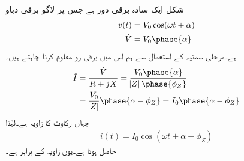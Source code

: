 شکل    ایک سادہ   برقی دور ہے جس پر لاگو برقی دباو
\begin{gather}
\begin{aligned}
v(t)&=V_0 \cos (\omega t +\alpha)\\
\hat{V}&=V_0 \phase{\alpha}
\end{aligned}
\end{gather}
ہے۔مرحلی سمتیہ کے استعمال سے ہم اس میں برقی رو  معلوم کرنا چاہتے ہیں۔
\begin{gather}
\begin{aligned}
\hat{I}&=\frac{\hat{V}}{R+j X}=\frac{V_0 \phase{\alpha}}{\abs{Z} \phase {\phi_Z}}\\
&=\frac{V_0}{\abs{Z}} \phase{\alpha-\phi_Z}=I_0 \phase{\alpha-\phi_Z}
\end{aligned}
\end{gather}
جہاں  رکاوٹ کا زاویہ  ہے۔لہٰذا
\begin{align}\label{مساوات_بنیادی_حقائق_دوری_سمتیہ_سے_مزاحمت_امالہ_دور_حل}
i(t)=I_0 \cos (\omega t +\alpha-\phi_Z)
\end{align}
حاصل ہوتا ہے۔یوں  زاویہ  کے برابر ہے۔
